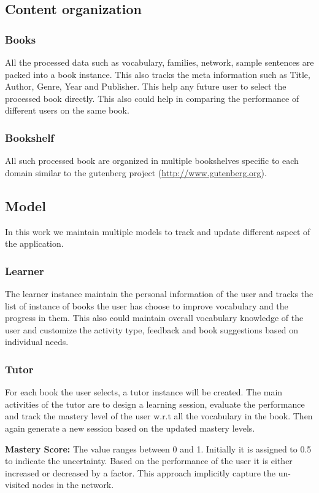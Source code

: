 \documentclass[11pt,a4paper]{article}
\begin{document}
\subsection{Content organization}
\subsubsection{Books}
All the processed data such as vocabulary, families, network, sample sentences
are packed into a book instance. This also tracks the meta information such as
Title, Author, Genre, Year and Publisher. This help any future user to select
the processed book directly. This also could help in comparing the performance
of different users on the same book.

\subsubsection{Bookshelf}
All such processed book are organized in multiple bookshelves specific to each
domain similar to the gutenberg project (\url{http://www.gutenberg.org}).

\subsection{Model}
In this work we maintain multiple models to track and update different aspect
of the application.

\subsubsection{Learner}
The learner instance maintain the personal information of the user and tracks
the list of instance of books the user has choose to improve vocabulary and the
progress in them. This also could maintain overall vocabulary knowledge of
the user and customize the activity type, feedback and book suggestions based
on individual needs.

\subsubsection{Tutor}
For each book the user selects, a tutor instance will be created. The main
activities of the tutor are to design a learning session, evaluate the
performance and track the mastery level of the user w.r.t all the vocabulary
in the book. Then again generate a new session based on the updated mastery
levels.

\textbf{Mastery Score:} The value ranges between 0 and 1. Initially it is
assigned to 0.5 to indicate the uncertainty. Based on the performance of the
user it is either increased or decreased by a factor. This approach implicitly
capture the un-visited nodes in the network.
\end{document}
